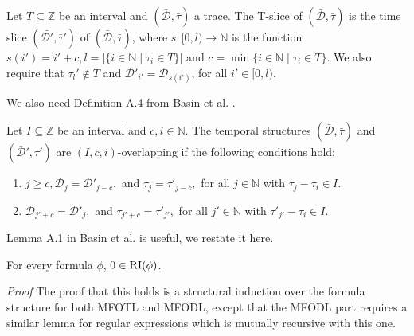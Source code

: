 \begin{definition}
    \label{def:t-slice}
    Let $T \subseteq \mathbb{Z}$ be an interval and $(\bar{\mathcal{D}}, \bar{\tau})$ a trace.
    The T-slice of $(\bar{\mathcal{D}}, \bar{\tau})$ is the time slice $(\bar{\mathcal{D}'}, \bar{\tau}')$ of $(\bar{\mathcal{D}}, \bar{\tau})$, 
        where $s: [0,l) \to \mathbb{N}$ is the function $s(i') = i' + c, l = |\{i \in \mathbb{N} \mid \tau_i \in T \}|$ and $c = \min\{i \in \mathbb{N} \mid \tau_i \in T \}$.
    We also require that $\tau_l' \not\in T$ and $\mathcal{D}'_{i'} = \mathcal{D}_{s(i')}$, for all $i' \in [0,l)$.
\end{definition}
We also need Definition A.4 from Basin et al. \cite{Basin2016}.
\begin{definition}
    \label{def:overlapping}
    Let $I \subseteq \mathbb{Z}$ be an interval and $c,i \in \mathbb{N}$.
    The temporal structures $(\bar{\mathcal{D}}, \bar{\tau})$ and $(\bar{\mathcal{D}}', \bar{\tau}')$ are $(I,c,i)$-overlapping if the following conditions hold:
    \renewcommand{\labelenumi}{\arabic{enumi}.}
    \begin{enumerate}
        \item $j \geq c, \mathcal{D}_j = \mathcal{D}'_{j-c},$ and $\tau_j = \tau'_{j-c},$ for all $j \in \mathbb{N}$ with $\tau_j - \tau_i \in I$.
        \item $\mathcal{D}_{j'+c} = \mathcal{D}'_j,$ and $\tau_{j'+c} = \tau'_{j'},$ for all $j' \in \mathbb{N}$ with $\tau'_{j'}-\tau_i \in I$.
    \end{enumerate}
\end{definition}

Lemma A.1 in Basin et al. \cite{Basin2016} is useful, we restate it here.
\begin{lemma}
    \label{lem:zero-ri}
    For every formula $\phi$, $0 \in \operatorname{RI}(\phi)$.
\end{lemma}
\textit{Proof}
The proof that this holds is a structural induction over the formula structure for both MFOTL and MFODL, except that the MFODL part requires a similar lemma for regular expressions which is mutually recursive with this one.

